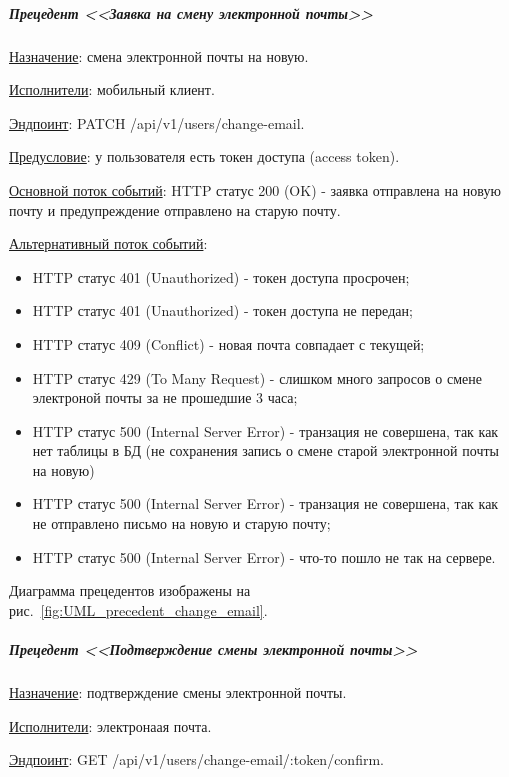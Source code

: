 
\subparagraph{Прецедент <<Заявка на смену электронной почты>>} \hspace{0pt}

\underline{Назначение}: смена электронной почты на новую.

\underline{Исполнители}: мобильный клиент.

\underline{Эндпоинт}: PATCH /api/v1/users/change-email.

\underline{Предусловие}: у пользователя есть токен доступа (access token).

\underline{Основной поток событий}: HTTP статус 200 (OK) - заявка отправлена на новую почту и предупреждение отправлено на старую почту.

\underline{Альтернативный поток событий}:

\begin{itemize}
    \item HTTP статус 401 (Unauthorized) - токен доступа просрочен;
    \item HTTP статус 401 (Unauthorized) - токен доступа не передан;
    \item HTTP статус 409 (Conflict) - новая почта совпадает с текущей;
    \item HTTP статус 429 (To Many Request) - слишком много запросов о смене электроной почты за не прошедшие 3 часа;
    \item HTTP статус 500 (Internal Server Error) - транзация не совершена, так как нет таблицы в БД (не сохранения запись о смене старой электронной почты на новую)
    \item HTTP статус 500 (Internal Server Error) - транзация не совершена, так как не отправлено письмо на новую и старую почту;
    \item HTTP статус 500 (Internal Server Error) - что-то пошло не так на сервере.
\end{itemize}

Диаграмма прецедентов изображены на рис.~\ref{fig:UML_precedent_change_email}.


\subparagraph{Прецедент <<Подтверждение смены электронной почты>>} \hspace{0pt}

\underline{Назначение}: подтверждение смены электронной почты.

\underline{Исполнители}: электронаая почта.

\underline{Эндпоинт}: GET /api/v1/users/change-email/:token/confirm.

